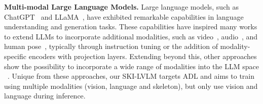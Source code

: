 \textbf{Multi-modal Large Language Models.}
Large language models, such as ChatGPT~\cite{chatgpt} and LLaMA~\cite{llama}, have exhibited remarkable capabilities in language understanding and generation tasks. These capabilities have inspired many works to extend LLMs to incorporate additional modalities, such as video~\cite{videollama, videollava, videochatgpt}, audio~\cite{zhang2023_speechgpt}, and human pose~\cite{feng2024_chatpose}, typically through instruction tuning or the addition of modality-specific encoders with projection layers. Extending beyond this, other approaches show the possibility to incorporate a wide range of modalities into the LLM space
~\cite{lu2022_unifiedio, su2023_pandagpt}. Unique 
from these approaches, our SKI-LVLM targets ADL and aims to train using multiple modalities (vision, language and skeleton), but only use vision and language during inference.